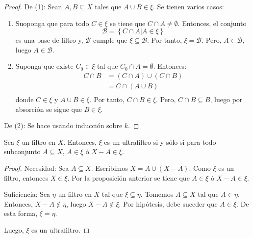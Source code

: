 \documentclass[12pt]{report}
\theoremstyle{largebreak}
\begin{document}
    \begin{proof}
        De (1): Sean $A,B\subseteq X$ tales que $A\cup B\in\xi$. Se tienen varios casos:
        \begin{enumerate}
            \item Suoponga que para todo $C\in\xi$ se tiene que $C\cap A\neq\emptyset$. Entonces, el conjunto
            \begin{equation*}
                \mathcal{B}=\left\{C\cap A\Big|A\in\xi \right\}
            \end{equation*}
            es una base de filtro y, $\mathcal{B}$ cumple que $\xi\subseteq\mathcal{B}$. Por tanto, $\xi=\mathcal{B}$. Pero, $A\in\mathcal{B}$, luego $A\in\mathcal{B}$.
            \item Suponga que existe $C_0\in\xi$ tal que $C_0\cap A=\emptyset$. Entonces:
            \begin{equation*}
                \begin{split}
                    C\cap B&=\left(C\cap A \right)\cup\left(C\cap B \right)\\
                    &=C\cap\left(A\cup B \right)\\
                \end{split}
            \end{equation*}
            donde $C\in\xi$ y $A\cup B\in\xi$. Por tanto, $C\cap B\in\xi$. Pero, $C\cap B\subseteq B$, luego por absorción se sigue que $B\in\xi$.
        \end{enumerate}

        De (2): Se hace usando inducción sobre $k$.
    \end{proof}

    \begin{propo}
        Sea $\xi$ un filtro en $X$. Entonces, $\xi$ es un ultrafiltro si y sólo si para todo subconjunto $A\subseteq X$, $A\in\xi$ ó $X-A\in\xi$.
    \end{propo}

    \begin{proof}
        Necesidad: Sea $A\subseteq X$. Escribimos $X=A\cup(X-A)$. Como $\xi$ es un filtro, entonces $X\in\xi$. Por la proposición anterior se tiene que $A\in\xi$ ó $X-A\in\xi$.

        Suficiencia: Sea $\eta$ un filtro en $X$ tal que $\xi\subseteq \eta$. Tomemos $A\subseteq X$ tal que $A\in\eta$. Entonces, $X-A\notin\eta$, luego $X-A\notin\xi$. Por hipótesis, debe suceder que $A\in\xi$. De esta forma, $\xi=\eta$.

        Luego, $\xi$ es un ultrafiltro.
    \end{proof}
\end{document}
